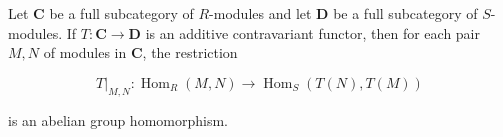 Let $\mathbf{C}$ be a full subcategory of $R$-modules and let $\mathbf{D}$ be a full subcategory of $S$-modules. If $T: \mathbf{C} \to \mathbf{D}$ is an additive contravariant functor, then for each pair $M, N$ of modules in $\mathbf{C}$, the restriction

$$T|_{M,N}: \operatorname{Hom}_R(M, N) \longrightarrow \operatorname{Hom}_S(T(N), T(M))$$

is an abelian group homomorphism.
